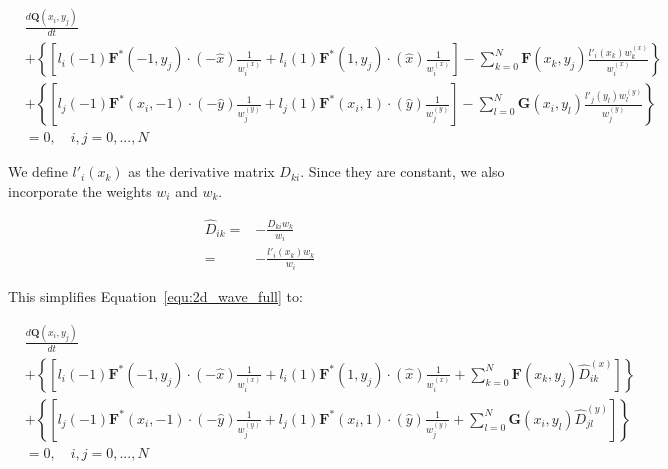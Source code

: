 \begin{equation} \label{equ:2d_wave_full}
	\begin{split}
        & \frac{d\mathbf{Q}(x_i, y_j)}{dt} \\
        & + \left\{ \left[ l_i \left( -1 \right) \mathbf{F}^* \left( -1, y_j \right) \cdot \left( -\widehat{x} \right) \frac{1}{w_i^{ \left( x \right) }} + l_i \left( 1 \right) \mathbf{F}^* \left( 1, y_j \right) \cdot
        \left( \widehat{x} \right) \frac{1}{w_i^{ \left( x \right) }} \right] - \sum_{k = 0}^{N} \mathbf{F} \left(x_k, y_j \right) \frac{l'_i \left( x_k \right) w_k^{ \left( x \right) }}{w_i^{ \left( x \right) }} \right\} \\
        & + \left\{ \left[ l_j \left( -1 \right) \mathbf{F}^* (x_i, -1) \cdot \left( -\widehat{y} \right) \frac{1}{w_j^{ \left( y \right) }} + l_j \left( 1 \right) \mathbf{F}^*(x_i, 1) \cdot
        \left( \widehat{y} \right) \frac{1}{w_j^{ \left( y \right) }} \right] - \sum_{l = 0}^{N} \mathbf{G} \left(x_i, y_l \right) \frac{l'_j \left( y_l \right) w_l^{ \left( y \right) }}{w_j^{ \left( y \right) }} \right\} \\
        & = 0, \quad i,j = 0, ..., N
	\end{split} 
\end{equation}

We define $l'_i(x_k)$ as the derivative matrix $D_{k i}$. Since they are constant, we also
incorporate the weights $w_i$ and $w_k$.

\begin{equation} \label{equ:d_hat}
	\begin{split}
        \widehat{D}_{i k} = & -\frac{D_{k i} w_k}{w_i} \\
        = & -\frac{l'_i(x_k) w_k}{w_i}
	\end{split} 
\end{equation}

This simplifies Equation~\ref{equ:2d_wave_full} to:

\begin{equation} \label{equ:2d_wave_d}
	\begin{split}
        & \frac{d\mathbf{Q}(x_i, y_j)}{dt} \\
        & + \left\{ \left[ l_i \left( -1 \right) \mathbf{F}^* \left( -1, y_j \right) \cdot \left( -\widehat{x} \right) \frac{1}{w_i^{ \left( x \right) }} + l_i \left( 1 \right) \mathbf{F}^* \left( 1, y_j \right) \cdot
        \left( \widehat{x} \right) \frac{1}{w_i^{ \left( x \right) }} + \sum_{k = 0}^{N} \mathbf{F} \left( x_k, y_j \right) \widehat{D}_{i k}^{ \left( x \right) } \right] \right\} \\
        & + \left \{ \left [ l_j \left( -1 \right) \mathbf{F}^* \left( x_i, -1 \right) \cdot \left( -\widehat{y} \right) \frac{1}{w_j^{ \left( y \right) }} + l_j \left( 1 \right) \mathbf{F}^* \left(x_i, 1 \right) \cdot
        \left( \widehat{y} \right) \frac{1}{w_j^{ \left( y \right) }} + \sum_{l = 0}^{N} \mathbf{G} \left( x_i, y_l \right) \widehat{D}_{j l}^{ \left( y \right) } \right] \right\} \\
        & = 0, \quad i, j = 0, ..., N
	\end{split}
\end{equation}

